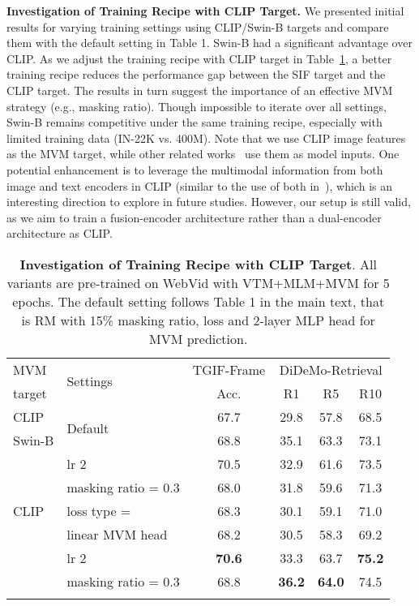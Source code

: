 \documentclass[10pt,twocolumn,letterpaper]{article}
\newlength\savewidth
\newcommand\shline{\noalign{\global\savewidth\arrayrulewidth\global\arrayrulewidth 1pt}\hline\noalign{\global\arrayrulewidth\savewidth}}
\newcommand{\tablestyle}[2]{\setlength{\tabcolsep}{#1}\renewcommand{\arraystretch}{#2}\centering\footnotesize}
\begin{document}
\vspace{0.5ex}
\noindent \textbf{Investigation of Training Recipe with CLIP Target.}
We presented initial results for varying training settings using CLIP/Swin-B targets and compare them with the default setting in Table 1. Swin-B had a significant advantage over CLIP. As we adjust the training recipe with CLIP target in Table~\ref{table:mvm-clip}, a better training recipe reduces the performance gap between the SIF target and the CLIP target. The results in turn suggest the importance of an effective MVM strategy (e.g., masking ratio). Though impossible to iterate over all settings, Swin-B remains competitive under the same training recipe, especially with limited training data (IN-22K vs. 400M). Note that we use CLIP image features as the MVM target, while other related works~\cite{ni2022expanding,lin2022frozen} use them as model inputs. One potential enhancement is to leverage the multimodal information from both image and text encoders in CLIP (similar to the use of both in~\cite{ni2022expanding}), which is an interesting direction to explore in future studies. However, our setup is still valid, as we aim to train a fusion-encoder architecture rather than a dual-encoder architecture as CLIP.
\vspace{-4ex}
\begin{table}[H]
\centering \tablestyle{5pt}{1.2}
\begin{tabular}{ll| cccc}
        \shline
        MVM & \multirow{2}{*}{Settings}  & TGIF-Frame & \multicolumn{3}{c}{DiDeMo-Retrieval} \\
        \cmidrule(lr){3-3}\cmidrule(lr){4-6}
        target & & Acc. & R1 & R5 & R10 \\
        \hline
        CLIP & \multirow{2}{*}{Default} & 67.7 & 29.8 & 57.8 & 68.5 \\
        Swin-B &  & 68.8 & 35.1 & 63.3 & 73.1 \\
        \hline
        \multirow{5}{*}{CLIP} & lr  2 &70.5  & 32.9 & 61.6 & 73.5 \\
& masking ratio = 0.3 & 68.0 & 31.8 & 59.6 & 71.3 \\
        & loss type =  & 68.3 & 30.1 & 59.1 & 71.0 \\
        & linear MVM head & 68.2 & 30.5 & 58.3 & 69.2\\
        \hline
       \multirow{2}{*}{Swin-B} & lr  2 & \textbf{70.6} & 33.3 & 63.7 & \textbf{75.2}\\
       & masking ratio = 0.3  & 68.8 & \textbf{36.2} & \textbf{64.0} & 74.5 \\
        \shline
    \end{tabular}
    \caption{\textbf{Investigation of Training Recipe with CLIP Target}. All variants are pre-trained on WebVid with VTM+MLM+MVM for 5 epochs. The default setting follows Table 1 in the main text, that is RM with 15\% masking ratio,  loss and 2-layer MLP head for MVM prediction.}
    \label{table:mvm-clip}
\end{table} 
\end{document}
